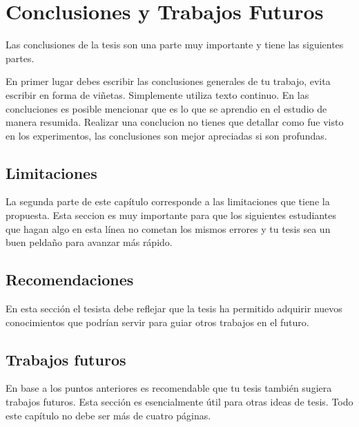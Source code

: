 \chapter{Conclusiones y Trabajos Futuros}\label{chap:conclusions}

Las conclusiones de la tesis son una parte muy importante y tiene las siguientes partes.

En primer lugar debes escribir las conclusiones generales de tu trabajo, evita escribir en forma de viñetas. Simplemente utiliza texto continuo. En las concluciones es posible mencionar que es lo que se aprendio en el estudio de manera resumida. Realizar una conclucion no tienes que detallar como fue visto en los experimentos, las conclusiones son mejor apreciadas si son profundas.

\section{Limitaciones}
La segunda  parte de este capítulo corresponde a las limitaciones que tiene la propuesta. Esta seccion es muy importante para que los siguientes estudiantes que hagan algo en esta línea no cometan los mismos errores y tu tesis sea un buen peldaño para avanzar más rápido.

\section{Recomendaciones}
En esta sección el tesista debe reflejar que la tesis ha permitido adquirir nuevos conocimientos que podrían servir para guiar otros trabajos en el futuro.

\section{Trabajos futuros}
En base a los puntos anteriores es recomendable que tu tesis también sugiera trabajos futuros. Esta sección es esencialmente útil para otras ideas de tesis. Todo este capítulo no debe ser más de cuatro páginas.

